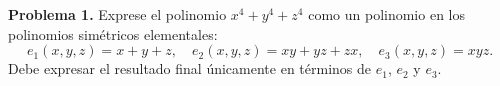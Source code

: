 \textbf{Problema 1.} Exprese el polinomio $x^4 + y^4 + z^4$ como un polinomio en los polinomios simétricos elementales:
\[
e_1(x,y,z)=x+y+z,\quad
e_2(x,y,z)=xy+yz+zx,\quad
e_3(x,y,z)=xyz.
\]
Debe expresar el resultado final únicamente en términos de $e_1$, $e_2$ y $e_3$.

